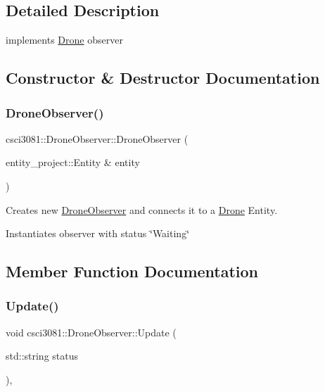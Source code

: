 \subsection{Detailed Description}
implements \hyperlink{classcsci3081_1_1Drone}{Drone} observer 

\subsection{Constructor \& Destructor Documentation}
\mbox{\label{classcsci3081_1_1DroneObserver_ad065c567a9ae5d96fd69c70b45a39426}} 
\subsubsection{\texorpdfstring{Drone\+Observer()}{DroneObserver()}}
{\footnotesize\ttfamily csci3081\+::\+Drone\+Observer\+::\+Drone\+Observer (\begin{DoxyParamCaption}\item[{entity\+\_\+project\+::\+Entity \&}]{entity }\end{DoxyParamCaption})\hspace{0.3cm}{\ttfamily [inline]}}



Creates new \hyperlink{classcsci3081_1_1DroneObserver}{Drone\+Observer} and connects it to a \hyperlink{classcsci3081_1_1Drone}{Drone} Entity. 

Instantiates observer with status \char`\"{}\+Waiting\char`\"{} 

\subsection{Member Function Documentation}
\mbox{\label{classcsci3081_1_1DroneObserver_a54e1312bb116755bfa2b9a07c04632f7}} 
\subsubsection{\texorpdfstring{Update()}{Update()}}
{\footnotesize\ttfamily void csci3081\+::\+Drone\+Observer\+::\+Update (\begin{DoxyParamCaption}\item[{std\+::string}]{status }\end{DoxyParamCaption})\hspace{0.3cm}{\ttfamily [inline]}, {\ttfamily [virtual]}}



